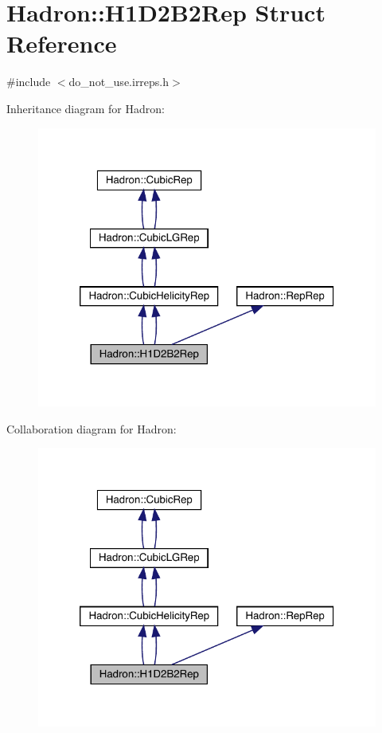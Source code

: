 \hypertarget{structHadron_1_1H1D2B2Rep}{}\section{Hadron\+:\+:H1\+D2\+B2\+Rep Struct Reference}
\label{structHadron_1_1H1D2B2Rep}


{\ttfamily \#include $<$do\+\_\+not\+\_\+use.\+irreps.\+h$>$}



Inheritance diagram for Hadron\+:\nopagebreak
\begin{figure}[H]
\begin{center}
\leavevmode
\includegraphics[width=320pt]{df/d11/structHadron_1_1H1D2B2Rep__inherit__graph}
\end{center}
\end{figure}


Collaboration diagram for Hadron\+:\nopagebreak
\begin{figure}[H]
\begin{center}
\leavevmode
\includegraphics[width=320pt]{d8/dd7/structHadron_1_1H1D2B2Rep__coll__graph}
\end{center}
\end{figure}
